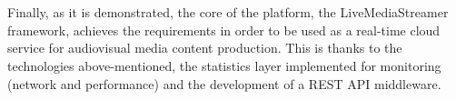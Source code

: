 \documentclass[english,final]{setup/eetac_tfc_pfc}
\begin{document}
\begin{overview}{11cm}
  \\
  \\
  Finally, as it is demonstrated, the core of the platform, the LiveMediaStreamer framework, achieves the requirements in order to be used as a real-time cloud service for audiovisual media content production. This is thanks to the technologies above-mentioned, the statistics layer implemented for monitoring (network and performance) and the development of a REST API middleware.

\end{overview}





\afterpreface




%         











\end{document}
